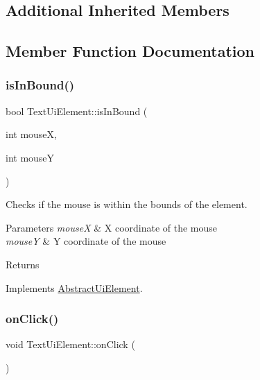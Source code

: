 \subsection*{Additional Inherited Members}


\subsection{Member Function Documentation}
\mbox{\label{class_text_ui_element_aaf04a9d0a67e77e2ba2a306e1ec7aeed}} 
\subsubsection{\texorpdfstring{is\+In\+Bound()}{isInBound()}}
{\footnotesize\ttfamily bool Text\+Ui\+Element\+::is\+In\+Bound (\begin{DoxyParamCaption}\item[{int}]{mouseX,  }\item[{int}]{mouseY }\end{DoxyParamCaption})\hspace{0.3cm}{\ttfamily [virtual]}}



Checks if the mouse is within the bounds of the element. 


\begin{DoxyParams}{Parameters}
{\em mouseX} & X coordinate of the mouse\\
\hline
{\em mouseY} & Y coordinate of the mouse\\
\hline
\end{DoxyParams}
\begin{DoxyReturn}{Returns}

\end{DoxyReturn}


Implements \mbox{\hyperlink{class_abstract_ui_element_ad2c415461cd7e8c1ee50b1105eb84685}{Abstract\+Ui\+Element}}.

\mbox{\label{class_text_ui_element_a984d8bcd627f43c1bd858a707df2c042}} 
\subsubsection{\texorpdfstring{on\+Click()}{onClick()}}
{\footnotesize\ttfamily void Text\+Ui\+Element\+::on\+Click (\begin{DoxyParamCaption}{ }\end{DoxyParamCaption})\hspace{0.3cm}{\ttfamily [virtual]}}



